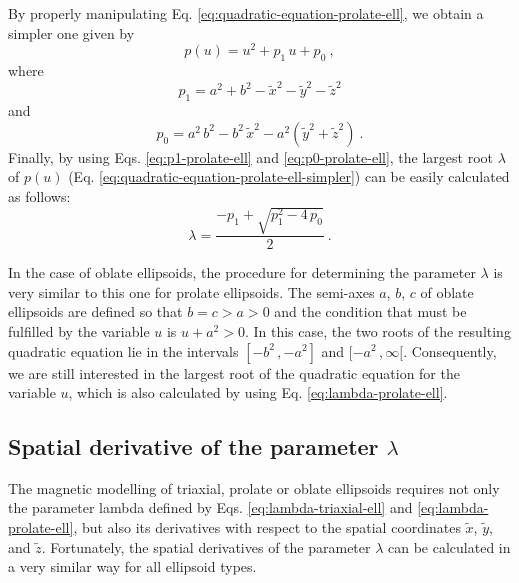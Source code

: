 \documentclass[gmd, manuscript]{copernicus}
\begin{document}
By properly manipulating Eq. \ref{eq:quadratic-equation-prolate-ell},
we obtain a simpler one given by
\begin{equation}
p(u) =  u^{2} + p_{1} \, u + p_{0} \: ,
\label{eq:quadratic-equation-prolate-ell-simpler}
\end{equation}
where
\begin{equation}
p_{1} = a^{2} + b^{2} - \tilde{x}^{2} - \tilde{y}^{2} - \tilde{z}^{2}
\label{eq:p1-prolate-ell}
\end{equation}
and
\begin{equation}
p_{0} =  a^{2} \, b^{2}
- b^{2} \, \tilde{x}^{2}
- a^{2} \left( \tilde{y}^{2} + \tilde{z}^{2} \right) \: .
\label{eq:p0-prolate-ell}
\end{equation}
Finally, by using Eqs. \ref{eq:p1-prolate-ell} and
\ref{eq:p0-prolate-ell}, the largest root $\lambda$ of $p(u)$
(Eq. \ref{eq:quadratic-equation-prolate-ell-simpler}) can be
easily calculated as follows:
\begin{equation}
\lambda = \frac{-p_{1} + \sqrt{p_{1}^{2} - 4 \, p_{0}}}{2} \: .
\label{eq:lambda-prolate-ell}
\end{equation}

In the case of oblate ellipsoids, the procedure for determining
the parameter $\lambda$ is very similar to this one for prolate
ellipsoids.
The semi-axes $a$, $b$, $c$ of oblate
ellipsoids are defined so that $b = c > a > 0$
and the condition that must be fulfilled by
the variable $u$ is $u + a^{2} > 0$.
In this case, the two roots of the resulting quadratic equation
lie in the intervals $[ -b^{2} \, , -a^{2} ]$ and $[ -a^{2} \, , \infty [$.
Consequently, we are still interested in the largest root of
the quadratic equation for the variable $u$, which is also
calculated by using Eq. \ref{eq:lambda-prolate-ell}.

\subsection{Spatial derivative of the parameter $\lambda$}

The magnetic modelling of triaxial, prolate or oblate ellipsoids
requires not only the parameter lambda defined by Eqs.
\ref{eq:lambda-triaxial-ell} and \ref{eq:lambda-prolate-ell},
but also its derivatives with respect to the spatial coordinates
$\tilde{x}$, $\tilde{y}$, and $\tilde{z}$.
Fortunately, the spatial derivatives of the parameter $\lambda$
can be calculated in a very similar way for all ellipsoid types.
\end{document}

